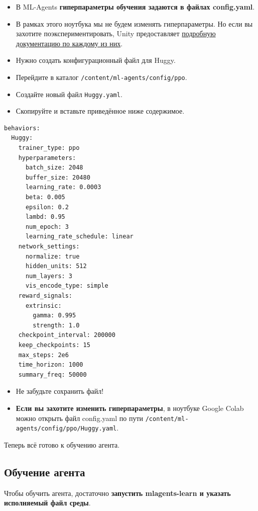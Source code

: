 \documentclass[11pt,a4paper]{article}
\begin{document}
\begin{itemize}
\item
  В ML-Agents \textbf{гиперпараметры обучения задаются в файлах config.yaml}.
\item
  В рамках этого ноутбука мы не будем изменять гиперпараметры. Но если вы захотите поэкспериментировать, Unity предоставляет \href{https://github.com/Unity-Technologies/ml-agents/blob/main/docs/Training-Configuration-File.md}{подробную документацию по каждому из них}.
\item
  Нужно создать конфигурационный файл для Huggy.
\item
  Перейдите в каталог \texttt{/content/ml-agents/config/ppo}.
\item
  Создайте новый файл \texttt{Huggy.yaml}.
\item
  Скопируйте и вставьте приведённое ниже содержимое.
\end{itemize}

\begin{lstlisting}
behaviors:
  Huggy:
    trainer_type: ppo
    hyperparameters:
      batch_size: 2048
      buffer_size: 20480
      learning_rate: 0.0003
      beta: 0.005
      epsilon: 0.2
      lambd: 0.95
      num_epoch: 3
      learning_rate_schedule: linear
    network_settings:
      normalize: true
      hidden_units: 512
      num_layers: 3
      vis_encode_type: simple
    reward_signals:
      extrinsic:
        gamma: 0.995
        strength: 1.0
    checkpoint_interval: 200000
    keep_checkpoints: 15
    max_steps: 2e6
    time_horizon: 1000
    summary_freq: 50000
\end{lstlisting}

\begin{itemize}
\item
  Не забудьте сохранить файл!
\item
  \textbf{Если вы захотите изменить гиперпараметры}, в ноутбуке Google Colab можно открыть файл config.yaml по пути \texttt{/content/ml-agents/config/ppo/Huggy.yaml}.
\end{itemize}

Теперь всё готово к обучению агента.

\subsection{Обучение агента}\label{train-our-agent}

Чтобы обучить агента, достаточно \textbf{запустить mlagents-learn и указать исполняемый файл среды}.
\end{document}
